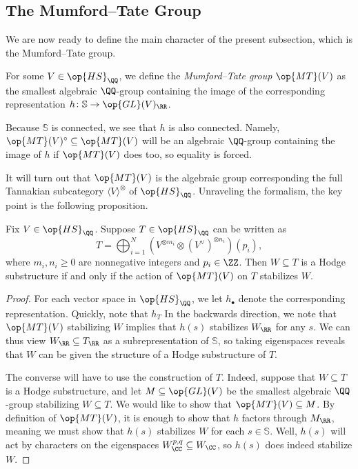 \documentclass{article}
\begin{document}

\subsection{The Mumford--Tate Group}
We are now ready to define the main character of the present subsection, which is the Mumford--Tate group.\todo{}
\begin{definition}
	For some $V\in\op{HS}_\QQ$, we define the \textit{Mumford--Tate group} $\op{MT}(V)$ as the smallest algebraic $\QQ$-group containing the image of the corresponding representation $h\colon\mathbb S\to\op{GL}(V)_\RR$.
\end{definition}
\begin{remark}
	Because $\mathbb S$ is connected, we see that $h$ is also connected. Namely, $\op{MT}(V)^\circ\subseteq\op{MT}(V)$ will be an algebraic $\QQ$-group containing the image of $h$ if $\op{MT}(V)$ does too, so equality is forced.
\end{remark}
It will turn out that $\op{MT}(V)$ is the algebraic group corresponding the full Tannakian subcategory $\langle V\rangle^{\otimes}$ of $\op{HS}_\QQ$. Unraveling the formalism, the key point is the following proposition.
\begin{proposition}
	Fix $V\in\op{HS}_\QQ$. Suppose $T\in\op{HS}_\QQ$ can be written as
	\[T=\bigoplus_{i=1}^N\left(V^{\otimes m_i}\otimes (V^\lor)^{\otimes n_i}\right)(p_i),\]
	where $m_i,n_i\ge0$ are nonnegative integers and $p_i\in\ZZ$. Then $W\subseteq T$ is a Hodge substructure if and only if the action of $\op{MT}(V)$ on $T$ stabilizes $W$.
\end{proposition}
\begin{proof}
	For each vector space in $\op{HS}_\QQ$, we let $h_\bullet$ denote the corresponding representation. Quickly, note that $h_T$ In the backwards direction, we note that $\op{MT}(V)$ stabilizing $W$ implies that $h(s)$ stabilizes $W_\RR$ for any $s$. We can thus view $W_\RR\subseteq T_\RR$ as a subrepresentation of $\mathbb S$, so taking eigenspaces reveals that $W$ can be given the structure of a Hodge substructure of $T$.

	The converse will have to use the construction of $T$. Indeed, suppose that $W\subseteq T$ is a Hodge substructure, and let $M\subseteq\op{GL}(V)$ be the smallest algebraic $\QQ$-group stabilizing $W\subseteq T$. We would like to show that $\op{MT}(V)\subseteq M$. By definition of $\op{MT}(V)$, it is enough to show that $h$ factors through $M_\RR$, meaning we must show that $h(s)$ stabilizes $W$ for each $s\in\mathbb S$. Well, $h(s)$ will act by characters on the eigenspaces $W^{p,q}_\CC\subseteq W_\CC$, so $h(s)$ does indeed stabilize $W$.
\end{proof}
\end{document}
